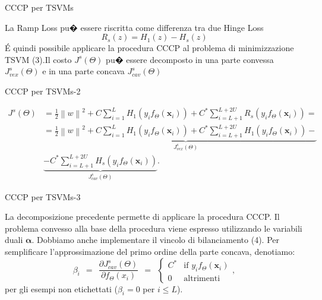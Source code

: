 \documentclass[mathserif]{beamer}
\begin{document}
\begin{frame}{CCCP per TSVMs}
\begin{block}{}
La Ramp Loss pu� essere riscritta come differenza tra due Hinge Loss
\begin{equation}
	R_s(z)=H_1(z)-H_s(z)
\end{equation}
\'E quindi possibile applicare la procedura CCCP al problema di minimizzazione TSVM (3).Il costo $J^s(\Theta)$ pu� essere decomposto in una parte convessa $J^s_{vex}(\Theta)$ e in una parte concava $J^s_{cav}(\Theta)$
\end{block}
\end{frame}

\begin{frame}{CCCP per TSVMs-2}
\begin{block}{}
\begin{equation}
\begin{split}
J^s(\Theta)& =\frac{1}{2}\left\|w\right\|^2+C\sum_{i=1}^{L}H_1(y_if_\Theta(\textbf{x}_i))+C^*\sum_{i=L+1}^{L+2U}R_s(y_if_\Theta(\textbf{x}_i))=\\
 & =\underbrace{\frac{1}{2}\left\|w\right\|^2+C\sum_{i=1}^{L}H_1(y_if_\Theta(\textbf{x}_i))+C^*\sum_{i=L+1}^{L+2U}H_1(y_if_\Theta(\textbf{x}_i))-}_{J^s_{vex}(\Theta)}\\
 &\underbrace{-C^*\sum_{i=L+1}^{L+2U}H_s(y_if_\Theta(\textbf{x}_i))}_{J^s_{cav}(\Theta)}.
\end{split}
\end{equation}
\end{block}
\end{frame}

\begin{frame}{CCCP per TSVMs-3}
\begin{block}{}
La decomposizione precedente permette di applicare la procedura CCCP. Il problema convesso alla base della procedura viene espresso utilizzando le variabili duali $\boldsymbol\alpha$. Dobbiamo anche implementare il vincolo di bilanciamento (4). 
Per semplificare l'approssimazione del primo ordine della parte concava, denotiamo:
\begin{equation}
\beta_i\ \  =\ \ 	\frac{\partial J_{cav}^{s}(\Theta)}{\partial f_{\Theta}(x_i)} \ \  = \ \ 
\begin{cases} 
C^* & \text{if } y_if_\Theta(\textbf{x}_i) \\
0 & \text{altrimenti }
\end{cases},
\end{equation}
per gli esempi non etichettati ($\beta_i=0$ per $i \leq L$).
\end{block}
\end{frame}
\end{document}
